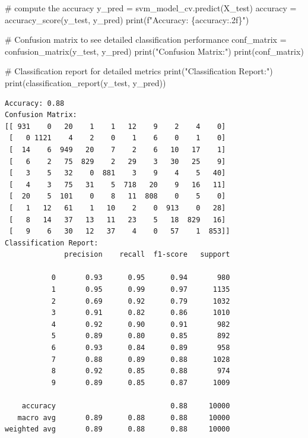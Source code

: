 \documentclass[
  letterpaper,
  DIV=11,
  numbers=noendperiod]{scrartcl}
\newenvironment{Shaded}{\begin{snugshade}}{\end{snugshade}}
\newcommand{\BuiltInTok}[1]{\textcolor[rgb]{0.00,0.23,0.31}{#1}}
\newcommand{\CommentTok}[1]{\textcolor[rgb]{0.37,0.37,0.37}{#1}}
\newcommand{\NormalTok}[1]{\textcolor[rgb]{0.00,0.23,0.31}{#1}}
\newcommand{\OperatorTok}[1]{\textcolor[rgb]{0.37,0.37,0.37}{#1}}
\newcommand{\SpecialCharTok}[1]{\textcolor[rgb]{0.37,0.37,0.37}{#1}}
\newcommand{\SpecialStringTok}[1]{\textcolor[rgb]{0.13,0.47,0.30}{#1}}
\newcommand{\StringTok}[1]{\textcolor[rgb]{0.13,0.47,0.30}{#1}}
\begin{document}
\begin{Shaded}
\begin{Highlighting}[]
\CommentTok{\# compute the accuracy}
\NormalTok{y\_pred }\OperatorTok{=}\NormalTok{ svm\_model\_cv.predict(X\_test)}
\NormalTok{accuracy }\OperatorTok{=}\NormalTok{ accuracy\_score(y\_test, y\_pred)}
\BuiltInTok{print}\NormalTok{(}\SpecialStringTok{f"Accuracy: }\SpecialCharTok{\{}\NormalTok{accuracy}\SpecialCharTok{:.2f\}}\SpecialStringTok{"}\NormalTok{)}

\CommentTok{\# Confusion matrix to see detailed classification performance}
\NormalTok{conf\_matrix }\OperatorTok{=}\NormalTok{ confusion\_matrix(y\_test, y\_pred)}
\BuiltInTok{print}\NormalTok{(}\StringTok{"Confusion Matrix:"}\NormalTok{)}
\BuiltInTok{print}\NormalTok{(conf\_matrix)}

\CommentTok{\# Classification report for detailed metrics}
\BuiltInTok{print}\NormalTok{(}\StringTok{"Classification Report:"}\NormalTok{)}
\BuiltInTok{print}\NormalTok{(classification\_report(y\_test, y\_pred))}
\end{Highlighting}
\end{Shaded}

\begin{verbatim}
Accuracy: 0.88
Confusion Matrix:
[[ 931    0   20    1    1   12    9    2    4    0]
 [   0 1121    4    2    0    1    6    0    1    0]
 [  14    6  949   20    7    2    6   10   17    1]
 [   6    2   75  829    2   29    3   30   25    9]
 [   3    5   32    0  881    3    9    4    5   40]
 [   4    3   75   31    5  718   20    9   16   11]
 [  20    5  101    0    8   11  808    0    5    0]
 [   1   12   61    1   10    2    0  913    0   28]
 [   8   14   37   13   11   23    5   18  829   16]
 [   9    6   30   12   37    4    0   57    1  853]]
Classification Report:
              precision    recall  f1-score   support

           0       0.93      0.95      0.94       980
           1       0.95      0.99      0.97      1135
           2       0.69      0.92      0.79      1032
           3       0.91      0.82      0.86      1010
           4       0.92      0.90      0.91       982
           5       0.89      0.80      0.85       892
           6       0.93      0.84      0.89       958
           7       0.88      0.89      0.88      1028
           8       0.92      0.85      0.88       974
           9       0.89      0.85      0.87      1009

    accuracy                           0.88     10000
   macro avg       0.89      0.88      0.88     10000
weighted avg       0.89      0.88      0.88     10000
\end{verbatim}
\end{document}

